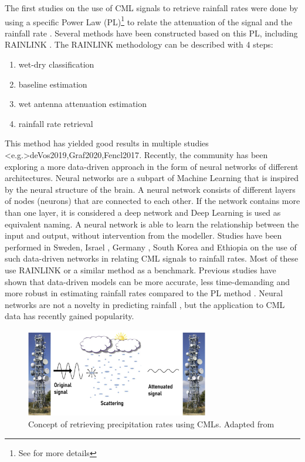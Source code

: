 \documentclass[twocolumn, 10pt, a4paper]{memoir}
\begin{document}
	The first studies on the use of CML signals to retrieve rainfall rates were done by using a specific Power Law (PL)\footnote{See  for more details} to relate the attenuation of the signal and the rainfall rate . Several methods have been constructed based on this PL, including RAINLINK . The RAINLINK methodology can be described with 4 steps: 
		\begin{enumerate}
			\item wet-dry classification
			\item baseline estimation
			\item wet antenna attenuation estimation
			\item rainfall rate retrieval
		\end{enumerate}
	This method has yielded good results in multiple studies \shortcite<e.g.>{deVos2019,Graf2020,Fencl2017}. Recently, the community has been exploring a more data-driven approach in the form of neural networks of different architectures. Neural networks are a subpart of Machine Learning that is inspired by the neural structure of the brain. A neural network consists of different layers of nodes (neurons) that are connected to each other. If the network contains more than one layer, it is considered a deep network and Deep Learning is used as equivalent naming. A neural network is able to learn the relationship between the input and output, without intervention from the modeller. Studies have been performed in Sweden, Israel , Germany , South Korea and Ethiopia \cite{Diba2021} on the use of such data-driven networks in relating CML signals to rainfall rates. Most of these use RAINLINK or a similar method as a benchmark. Previous studies have shown that data-driven models can be more accurate, less time-demanding and more robust in estimating rainfall rates compared to the PL method .  Neural networks are not a novelty in predicting rainfall , but the application to CML data has recently gained popularity.
	
	\begin{figure}[t]
		\includegraphics[width=8cm]{CML_concept_adapted}
		\caption{Concept of retrieving precipitation rates using CMLs. Adapted from \protect{} }
		\label{fig: CML attenuation}
	\end{figure}
	
\end{document}
